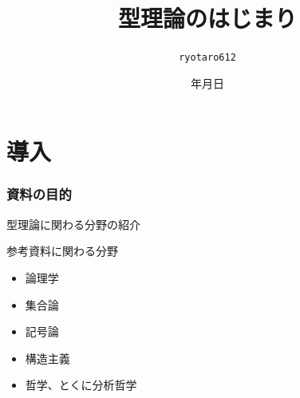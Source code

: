 \documentclass[unicode, 14pt, aspectratio=169]{beamer}
\date{\number\year 年\number\month 月\number\day 日}
\title{型理論のはじまり}
\author{\texttt{ryotaro612}}
\begin{document}
\begin{frame}
\titlepage
\end{frame}
\section{導入}
\begin{frame}
  \frametitle{資料の目的}
  {\large 型理論に関わる分野の紹介}
  \par
  \vspace{16pt}
  参考資料に関わる分野
  \begin{itemize}
  \item 論理学
  \item 集合論
  \item 記号論
  \item 構造主義
  \item 哲学、とくに分析哲学
  \end{itemize}
\end{frame}
\end{document}
